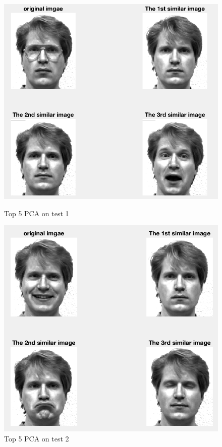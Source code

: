 \documentclass{article}
\begin{document}
\begin{figure}[htbp]
\centering
\begin{minipage}[t]{0.48\textwidth}
\centering
\includegraphics[scale = 0.3]{5_1.png}
\caption{Top 5 PCA on test 1}
\end{minipage}
\begin{minipage}[t]{0.48\textwidth}
\centering
\includegraphics[scale = 0.3]{5_2.png}
\caption{Top 5 PCA on test 2}
\end{minipage}
\end{figure}
\end{document}
